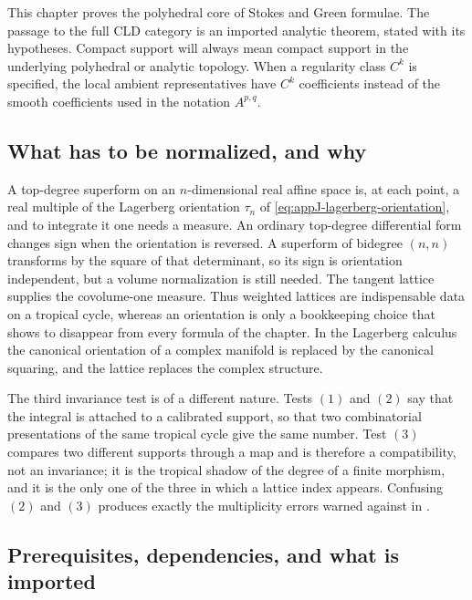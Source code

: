 This chapter proves the polyhedral core of Stokes and Green formulae.  The
passage to the full CLD category is an imported analytic theorem, stated with
its hypotheses.  Compact support will always mean compact support in the
underlying polyhedral or analytic topology.  When a regularity class $C^k$
is specified, the local ambient representatives have $C^k$ coefficients
instead of the smooth coefficients used in the notation $A^{p,q}$.

\subsection{What has to be normalized, and why}
\label{sec:ch11-what-normalized}

A top-degree superform on an $n$-dimensional real affine space is, at each
point, a real multiple of the Lagerberg orientation $\tau_n$ of
\eqref{eq:appJ-lagerberg-orientation}, and to integrate it one needs a
measure.  An ordinary top-degree differential form changes sign when the
orientation is reversed.  A superform of bidegree $(n,n)$ transforms by the
square of that determinant, so its sign is orientation independent, but a
volume normalization is still needed.  The tangent lattice supplies the
covolume-one measure.  Thus weighted lattices are indispensable data on a
tropical cycle, whereas an orientation is only a bookkeeping choice that
 shows to disappear from every formula
of the chapter.  In the Lagerberg calculus the canonical orientation of a
complex manifold is replaced by the canonical squaring, and the lattice
replaces the complex structure.

The third invariance test is of a different nature.  Tests $(1)$ and
$(2)$ say that the integral is attached to a calibrated support, so that
two combinatorial presentations of the same tropical cycle give the same
number.  Test $(3)$ compares two different supports through a map and is
therefore a compatibility, not an invariance; it is the tropical shadow of
the degree of a finite morphism, and it is the only one of the three in which
a lattice index appears.  Confusing $(2)$ and $(3)$ produces exactly the
multiplicity errors warned against in .

\subsection{Prerequisites, dependencies, and what is imported}
\label{sec:ch11-prerequisites}

